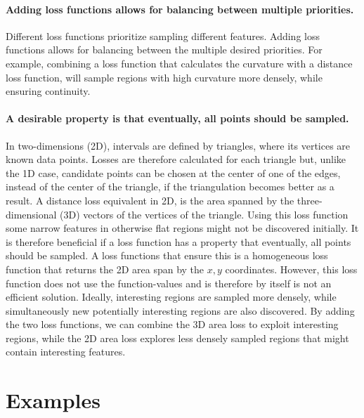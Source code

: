\hypertarget{adding-loss-functions-allows-for-balancing-between-multiple-priorities.}{%
\paragraph{Adding loss functions allows for balancing between multiple priorities.}\label{adding-loss-functions-allows-for-balancing-between-multiple-priorities.}}

Different loss functions prioritize sampling different features.
Adding loss functions allows for balancing between the multiple desired priorities.
For example, combining a loss function that calculates the curvature with a distance loss function, will sample regions with high curvature more densely, while ensuring continuity.

\hypertarget{a-desirable-property-is-that-eventually-all-points-should-be-sampled.}{%
\paragraph{A desirable property is that eventually, all points should be sampled.}\label{a-desirable-property-is-that-eventually-all-points-should-be-sampled.}}

In two-dimensions (2D), intervals are defined by triangles, where its vertices are known data points.
Losses are therefore calculated for each triangle but, unlike the 1D case, candidate points can be chosen at the center of one of the edges, instead of the center of the triangle, if the triangulation becomes better as a result.
A distance loss equivalent in 2D, is the area spanned by the three-dimensional (3D) vectors of the vertices of the triangle.
Using this loss function some narrow features in otherwise flat regions might not be discovered initially.
It is therefore beneficial if a loss function has a property that eventually, all points should be sampled.
A loss functions that ensure this is a homogeneous loss function that returns the 2D area span by the $x, y$ coordinates.
However, this loss function does not use the function-values and is therefore by itself is not an efficient solution.
Ideally, interesting regions are sampled more densely, while simultaneously new potentially interesting regions are also discovered.
By adding the two loss functions, we can combine the 3D area loss to exploit interesting regions, while the 2D area loss explores less densely sampled regions that might contain interesting features.

\hypertarget{examples}{%
\section{Examples}\label{examples}}

